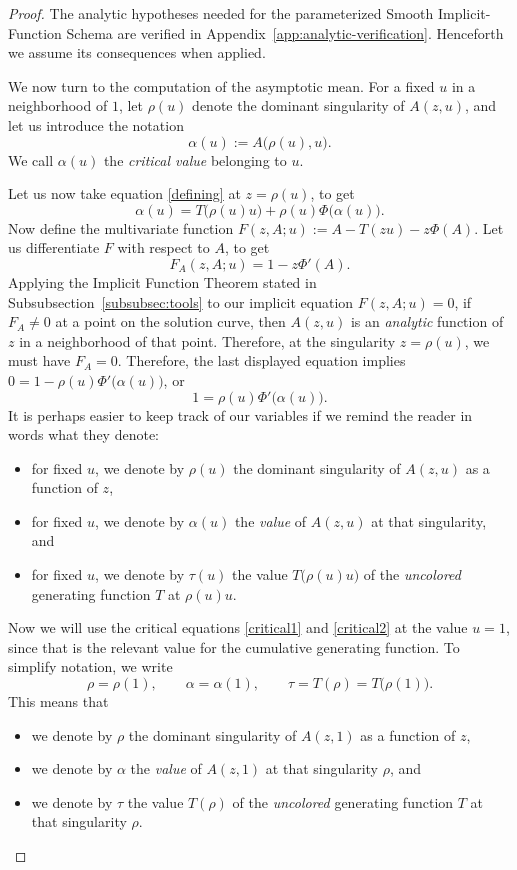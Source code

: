 \documentclass[10pt,a4paper]{amsart}
\theoremstyle{remark}
\begin{document}
\begin{proof}
The analytic hypotheses needed for the parameterized Smooth
Implicit-Function Schema are verified in
Appendix~\ref{app:analytic-verification}. Henceforth we assume its consequences when applied.

We now turn to the computation of the asymptotic mean.  For a fixed \(u\) in a neighborhood of \(1\), let \(\rho(u)\) denote the
dominant singularity of \(A(z,u)\), and let us introduce the notation
\[
\alpha(u):=A\big(\rho(u),u\big). 
\]
We call $\alpha(u)$ the {\em critical value} belonging to $u$. 

Let us now take equation \eqref{defining} at $z=\rho(u)$, to get
\begin{equation}
\label{critical1}
	\alpha(u) = T\big(\rho(u)u\big)+\rho(u)\Phi\big(\alpha(u)\big).
\end{equation} 
Now define the multivariate function $F(z, A; u):=A-T(zu)-z\Phi(A)$.
Let us differentiate $F$ with respect to $A$, to get 
\[F_A(z,A;u)=1-z\Phi'(A).\]
Applying the Implicit Function Theorem stated in Subsubsection~\ref{subsubsec:tools} to our implicit equation $F(z,A;u)=0$, if $F_A\neq 0$ at a point on the solution curve, then $A(z,u)$ is an {\em analytic} function of $z$ in a neighborhood of that point.
Therefore, at the singularity $z=\rho(u)$, we must have $F_A=0$. Therefore, the last displayed equation implies
$0=1-\rho(u)\Phi'\big(\alpha(u)\big)$, or
\begin{equation}  
1
=
\rho(u)\Phi'\big(\alpha(u)\big).
\label{critical2}
\end{equation}
It is perhaps easier to keep track of our variables if we remind the reader in words what they denote:
\begin{itemize}
\item for fixed $u$, we denote by $\rho(u)$  the dominant singularity of $A(z,u)$ as a function of $z$,
\item for fixed $u$, we denote by $\alpha(u)$ the {\em value} of $A(z,u)$ at that singularity, and
\item for fixed $u$, we denote by $\tau(u)$ the value $T\big(\rho(u)u\big)$ of the {\em uncolored} generating function $T$ at $\rho(u)u$.
\end{itemize}

Now we will use the critical equations \eqref{critical1} and \eqref{critical2} at the value $u=1$, since
that is the relevant value for the cumulative generating function.
To simplify notation, we   write
\[
\rho=\rho(1),\qquad
\alpha=\alpha(1),\qquad
\tau=T(\rho)=T\big(\rho(1)\big).
\]
This means that
\begin{itemize}
\item we denote by $\rho$  the dominant singularity of $A(z,1)$ as a function of $z$,
\item  we denote by $\alpha$ the {\em value} of $A(z,1)$ at that singularity $\rho$, and
\item  we denote by $\tau$ the value $T(\rho)$ of the {\em uncolored} generating function $T$ at that singularity $\rho$.
\end{itemize}


\end{proof}
\end{document}
